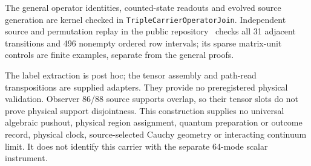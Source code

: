 The general operator identities, counted-state readouts and evolved
source generation are kernel checked in
\texttt{TripleCarrierOperatorJoin}. Independent source and
permutation replay in the public repository~\cite{ophrepo} checks all 31
adjacent transitions and 496 nonempty ordered row intervals; its sparse
matrix-unit controls are finite examples, separate from the general proofs.

The label extraction is post hoc; the tensor assembly and path-read
transpositions are supplied adapters. They provide no preregistered physical
validation.
Observer 86/88 source supports overlap, so their tensor slots do not prove
physical support disjointness. This construction supplies no universal
algebraic pushout, physical region assignment, quantum preparation or outcome
record, physical clock, source-selected Cauchy geometry or interacting
continuum limit. It does not identify this carrier with the separate
64-mode scalar instrument.
